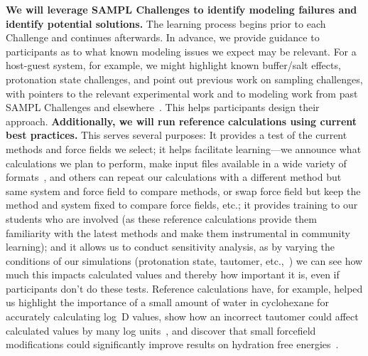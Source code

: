 \documentclass[11pt]{article}
\begin{document}
\textbf{We will leverage SAMPL Challenges to identify modeling failures and identify potential solutions.} 
The learning process begins prior to each Challenge and continues afterwards. 
In advance,  we provide guidance to participants as to what known modeling issues we expect may be relevant.
For a host-guest system, for example, we might highlight known buffer/salt effects, protonation state challenges, and point out previous work on sampling challenges, with pointers to the relevant experimental work and to modeling work from past SAMPL Challenges and elsewhere~\cite{Mobley:2017:AnnualReviewofBiophysics}.
This helps participants design their approach.
{\bf Additionally, we will run reference calculations using current best practices.} 
This serves several purposes:
It provides a test of the current methods and force fields we select; it helps facilitate learning---we announce what calculations we plan to perform, make input files available in a wide variety of formats~\cite{shirts_lessons_2016, yin_overview_2016, Bannan:2016:JComputAidedMolDes}, and others can repeat our calculations with a different method but same system and force field to compare methods, or swap force field but keep the method and system fixed to compare force fields, etc.; it provides training to our students who are involved (as these reference calculations provide them familiarity with the latest methods and make them instrumental in community learning);  and it allows us to conduct sensitivity analysis, as by varying the conditions of our simulations (protonation state, tautomer, etc.,~\cite{Bannan:2016:JComputAidedMolDes}) we can see how much this impacts calculated values and thereby how important it is, even if participants don't do these tests.
Reference calculations have, for example, helped us highlight the importance of a small amount of water in cyclohexane for accurately calculating log~D values, show how an incorrect tautomer could affect calculated values by many log units~\cite{Bannan:2016:JComputAidedMolDes}, and discover that small forcefield modifications could significantly improve results on hydration free energies~\cite{mobley_blind_2014-1}.
\end{document}
